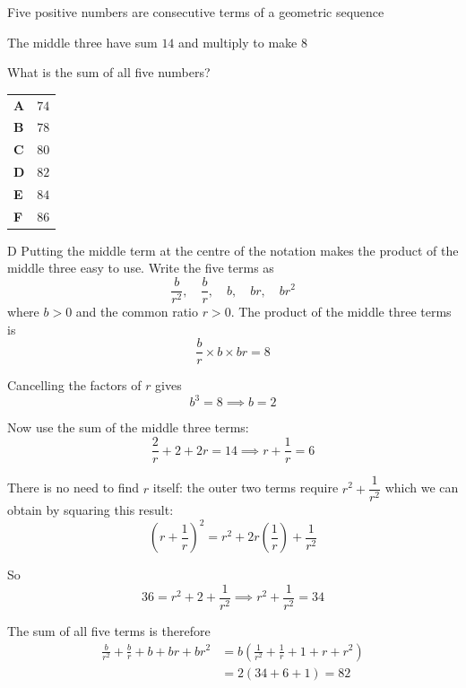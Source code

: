 \documentclass[11pt,a4paper]{article}
\begin{document}
\begin{enumerate}[label=\textbf{\arabic*.},leftmargin=*,itemsep=0pt,start=8]
Five positive numbers are consecutive terms of a geometric sequence 

The middle three have sum $14$ and multiply to make $8$

What is the sum of all five numbers?

\par\vspace*{12pt}
\begin{tabularx}{\linewidth}{@{}>{\bfseries}l Y@{}}
A &
$74$
\\[0.8em]
B &
$78$
\\[0.8em]
C &
$80$
\\[0.8em]
D &
$82$
\\[0.8em]
E &
$84$
\\[0.8em]
F &
$86$
\\
\end{tabularx}

\begin{djsSolution}{D}
Putting the middle term at the centre of the notation makes the product of the middle three easy to use. Write the five terms as
\[
\frac{b}{r^2},\quad \frac{b}{r},\quad b,\quad br,\quad br^2
\]
where $b>0$ and the common ratio $r>0$. The product of the middle three terms is
\[
\frac{b}{r}\times b\times br=8
\]

Cancelling the factors of $r$ gives
\[
b^3=8 \implies \boxed{b=2}
\]

Now use the sum of the middle three terms:
\[
\frac{2}{r}+2+2r=14 \implies r+\frac{1}{r}=6
\]


There is no need to find $r$ itself: the outer two terms require $r^2+\dfrac{1}{r^2}$ which we can obtain by squaring this result:
\[
\left(r+\frac{1}{r}\right)^2=r^2+2r\left(\frac{1}{r}\right)+\frac{1}{r^2}
\]

So
\[
36=r^2+2+\frac{1}{r^2} \implies \boxed{r^2+\frac{1}{r^2}=34}
\]


The sum of all five terms is therefore
\[
\begin{aligned}
\frac{b}{r^2}+\frac{b}{r}+b+br+br^2
&=b\left(\frac{1}{r^2}+\frac{1}{r}+1+r+r^2\right)\\[8pt]
&=2(34+6+1)=\boxed{82}
\end{aligned}
\]


\end{djsSolution}
\end{enumerate}
\end{document}
